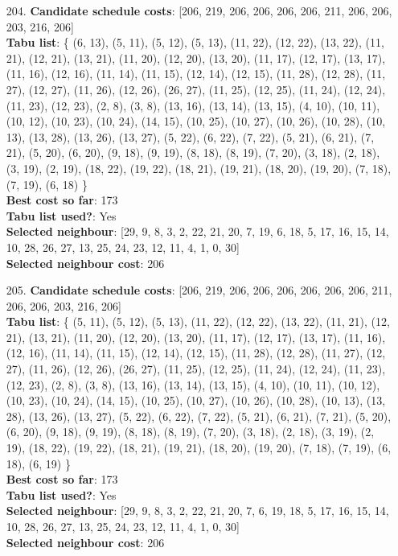 \documentclass[fleqn]{article}
\begin{document}
\begin{itemize}
    \item[204.] \textbf{Candidate schedule costs}: [206, 219, 206, 206, 206, 206, 211, 206, 206, 203, 216, 206] \\
    \textbf{Tabu list}: \{ (6, 13), (5, 11), (5, 12), (5, 13), (11, 22), (12, 22), (13, 22), (11, 21), (12, 21), (13, 21), (11, 20), (12, 20), (13, 20), (11, 17), (12, 17), (13, 17), (11, 16), (12, 16), (11, 14), (11, 15), (12, 14), (12, 15), (11, 28), (12, 28), (11, 27), (12, 27), (11, 26), (12, 26), (26, 27), (11, 25), (12, 25), (11, 24), (12, 24), (11, 23), (12, 23), (2, 8), (3, 8), (13, 16), (13, 14), (13, 15), (4, 10), (10, 11), (10, 12), (10, 23), (10, 24), (14, 15), (10, 25), (10, 27), (10, 26), (10, 28), (10, 13), (13, 28), (13, 26), (13, 27), (5, 22), (6, 22), (7, 22), (5, 21), (6, 21), (7, 21), (5, 20), (6, 20), (9, 18), (9, 19), (8, 18), (8, 19), (7, 20), (3, 18), (2, 18), (3, 19), (2, 19), (18, 22), (19, 22), (18, 21), (19, 21), (18, 20), (19, 20), (7, 18), (7, 19), (6, 18) \} \\
    \textbf{Best cost so far}: 173 \\
    \textbf{Tabu list used?}: Yes \\
    \textbf{Selected neighbour}: [29, 9, 8, 3, 2, 22, 21, 20, 7, 19, 6, 18, 5, 17, 16, 15, 14, 10, 28, 26, 27, 13, 25, 24, 23, 12, 11, 4, 1, 0, 30] \\
    \textbf{Selected neighbour cost}: 206
      

    \item[205.] \textbf{Candidate schedule costs}: [206, 219, 206, 206, 206, 206, 206, 206, 211, 206, 206, 203, 216, 206] \\
    \textbf{Tabu list}: \{ (5, 11), (5, 12), (5, 13), (11, 22), (12, 22), (13, 22), (11, 21), (12, 21), (13, 21), (11, 20), (12, 20), (13, 20), (11, 17), (12, 17), (13, 17), (11, 16), (12, 16), (11, 14), (11, 15), (12, 14), (12, 15), (11, 28), (12, 28), (11, 27), (12, 27), (11, 26), (12, 26), (26, 27), (11, 25), (12, 25), (11, 24), (12, 24), (11, 23), (12, 23), (2, 8), (3, 8), (13, 16), (13, 14), (13, 15), (4, 10), (10, 11), (10, 12), (10, 23), (10, 24), (14, 15), (10, 25), (10, 27), (10, 26), (10, 28), (10, 13), (13, 28), (13, 26), (13, 27), (5, 22), (6, 22), (7, 22), (5, 21), (6, 21), (7, 21), (5, 20), (6, 20), (9, 18), (9, 19), (8, 18), (8, 19), (7, 20), (3, 18), (2, 18), (3, 19), (2, 19), (18, 22), (19, 22), (18, 21), (19, 21), (18, 20), (19, 20), (7, 18), (7, 19), (6, 18), (6, 19) \} \\
    \textbf{Best cost so far}: 173 \\
    \textbf{Tabu list used?}: Yes \\
    \textbf{Selected neighbour}: [29, 9, 8, 3, 2, 22, 21, 20, 7, 6, 19, 18, 5, 17, 16, 15, 14, 10, 28, 26, 27, 13, 25, 24, 23, 12, 11, 4, 1, 0, 30] \\
    \textbf{Selected neighbour cost}: 206
      


\end{itemize}
\end{document}
